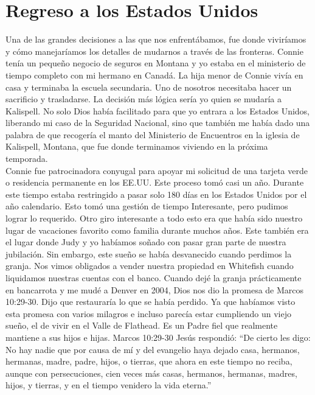 \documentclass[twoside, 12pt]{book}
\begin{document}
\section{Regreso a los Estados Unidos}

Una de las grandes decisiones a las que nos enfrentábamos, fue donde viviríamos y cómo manejaríamos los detalles de mudarnos a través de las fronteras. Connie tenía un pequeño negocio de seguros en Montana y yo estaba en el ministerio de tiempo completo con mi hermano en Canadá. La hija menor de Connie vivía en casa y terminaba la escuela secundaria. Uno de nosotros necesitaba hacer un sacrificio y trasladarse. La decisión más lógica sería yo quien se mudaría a Kalispell. No solo Dios había facilitado para que yo entrara a los Estados Unidos, liberando mi caso de la Seguridad Nacional, sino que también me había dado una palabra de que recogería el manto del Ministerio de Encuentros en la iglesia de Kalispell, Montana, que fue donde terminamos viviendo en la próxima temporada.\\

Connie fue patrocinadora conyugal para apoyar mi solicitud de una tarjeta verde o residencia permanente en los EE.UU.  Este proceso tomó casi un año.  Durante este tiempo estaba restringido a pasar solo 180 días en los Estados Unidos por el año calendario. Esto tomó una gestión de tiempo Interesante, pero pudimos lograr lo requerido. Otro giro interesante a todo esto era que había sido nuestro lugar de vacaciones favorito como familia durante muchos años. Este también era el lugar donde Judy y yo habíamos soñado con pasar gran parte de nuestra jubilación. Sin embargo, este sueño se había desvanecido cuando perdimos la granja. Nos vimos obligados a vender nuestra propiedad en Whitefish cuando liquidamos nuestras cuentas con el banco. Cuando dejé la granja prácticamente en bancarrota y me mudé a Denver en 2004, Dios nos dio la promesa de Marcos 10:29-30. Dijo que restauraría lo que se había perdido.  Ya que habíamos visto esta promesa con varios milagros e incluso parecía estar cumpliendo un viejo sueño, el de vivir en el Valle de Flathead.  Es un Padre fiel que realmente mantiene a sus hijos e hijas.  Marcos 10:29-30 Jesús respondió: “De cierto les digo: No hay nadie que por causa de mí y del evangelio haya dejado casa, hermanos, hermanas, madre, padre, hijos, o tierras, que ahora en este tiempo no reciba, aunque con persecuciones, cien veces más casas, hermanos, hermanas, madres, hijos, y tierras, y en el tiempo venidero la vida eterna.”\\
\end{document}
